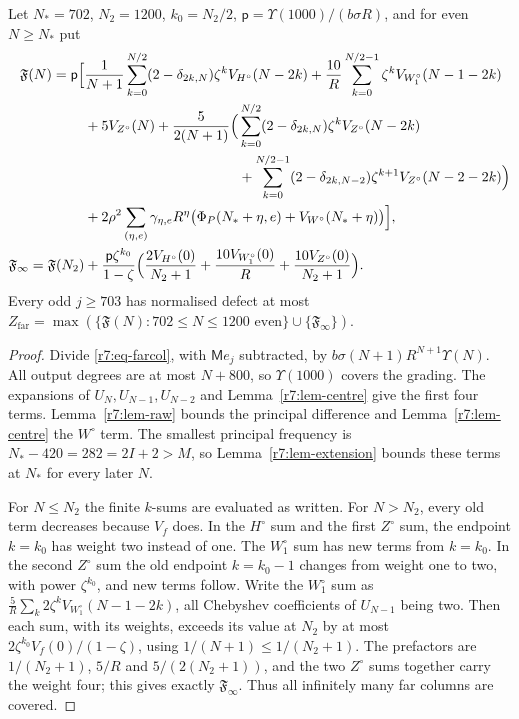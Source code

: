 \begin{proposition}\label{r7:prop-far}
Let $N_*=702$, $N_2=1200$, $k_0=N_2/2$, $\mathsf p=\Upsilon(1000)/(b\sigma R)$, and for even $N\geq N_*$ put
\begin{align*}
\mathfrak F(N)=\mathsf p\Big[&\frac1{N+1}\sum_{k=0}^{N/2}(2-\delta_{2k,N})\zeta^kV_{H^\circ}(N-2k)
+\frac{10}R\sum_{k=0}^{N/2-1}\zeta^kV_{W_1^\circ}(N-1-2k)\\
&+5V_{Z^\circ}(N)+\frac5{2(N+1)}\Big(\sum_{k=0}^{N/2}(2-\delta_{2k,N})\zeta^kV_{Z^\circ}(N-2k)\\
&\hphantom{{}+5V_{Z^\circ}(N)+\frac5{2(N+1)}\Big(}
+\sum_{k=0}^{N/2-1}(2-\delta_{2k,N-2})\zeta^{k+1}V_{Z^\circ}(N-2-2k)\Big)\\
&+2\rho^2\sum_{(\eta,e)}\gamma_{\eta,e}R^\eta\big(\Phi_P(N_*+\eta,e)+V_{W^\circ}(N_*+\eta)\big)\Big],\\
\mathfrak F_\infty=\mathfrak F(N_2)&+\frac{\mathsf p\zeta^{k_0}}{1-\zeta}
\Big(\frac{2V_{H^\circ}(0)}{N_2+1}+\frac{10V_{W_1^\circ}(0)}R+\frac{10V_{Z^\circ}(0)}{N_2+1}\Big).
\end{align*}
Every odd $j\geq703$ has normalised defect at most
$Z_{\mathrm{far}}=\max(\{\mathfrak F(N):702\leq N\leq1200\text{ even}\}\cup\{\mathfrak F_\infty\})$.
\end{proposition}
\begin{proof}
Divide \eqref{r7:eq-farcol}, with $\mathsf Me_j$ subtracted, by $b\sigma(N+1)R^{N+1}\Upsilon(N)$. All output degrees are at most $N+800$, so $\Upsilon(1000)$ covers the grading. The expansions of $U_N,U_{N-1},U_{N-2}$ and Lemma~\ref{r7:lem-centre} give the first four terms. Lemma~\ref{r7:lem-raw} bounds the principal difference and Lemma~\ref{r7:lem-centre} the $W^\circ$ term. The smallest principal frequency is $N_*-420=282=2I+2>M$, so Lemma~\ref{r7:lem-extension} bounds these terms at $N_*$ for every later $N$.

For $N\leq N_2$ the finite $k$-sums are evaluated as written. For $N>N_2$, every old term decreases because $V_f$ does. In the $H^\circ$ sum and the first $Z^\circ$ sum, the endpoint $k=k_0$ has weight two instead of one. The $W_1^\circ$ sum has new terms from $k=k_0$. In the second $Z^\circ$ sum the old endpoint $k=k_0-1$ changes from weight one to two, with power $\zeta^{k_0}$, and new terms follow. Write the $W_1^\circ$ sum as $\frac5R\sum_k2\zeta^kV_{W_1^\circ}(N-1-2k)$, all Chebyshev coefficients of $U_{N-1}$ being two. Then each sum, with its weights, exceeds its value at $N_2$ by at most $2\zeta^{k_0}V_f(0)/(1-\zeta)$, using $1/(N+1)\leq1/(N_2+1)$. The prefactors are $1/(N_2+1)$, $5/R$ and $5/(2(N_2+1))$, and the two $Z^\circ$ sums together carry the weight four; this gives exactly $\mathfrak F_\infty$. Thus all infinitely many far columns are covered.
\end{proof}

